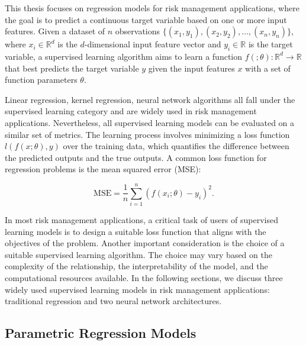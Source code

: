 This thesis focuses on regression models for risk management applications, where the goal is to predict a continuous target variable based on one or more input features.
Given a dataset of $n$ observations $\{(x_1, y_1), (x_2, y_2), \ldots, (x_n, y_n)\}$, where $x_i \in \mathbb{R}^d$ is the $d$-dimensional input feature vector and $y_i \in \mathbb{R}$ is the target variable, a supervised learning algorithm aims to learn a function $f(;\theta): \mathbb{R}^d \rightarrow \mathbb{R}$ that best predicts the target variable $y$ given the input features $x$ with a set of function parameters $\theta$.

Linear regression, kernel regression, neural network algorithms all fall under the supervised learning category and are widely used in risk management applications.
Nevertheless, all supervised learning models can be evaluated on a similar set of metrics.
The learning process involves minimizing a loss function $l(f(x; \theta),y)$ over the training data, which quantifies the difference between the predicted outputs and the true outputs. 
A common loss function for regression problems is the mean squared error (MSE):

\begin{equation}
    \text{MSE} = \frac{1}{n} \sum_{i=1}^{n} (f(x_i;\theta) - y_i)^2.
\end{equation}

In most risk management applications, a critical task of users of supervised learning models is to design a suitable loss function that aligns with the objectives of the problem.
Another important consideration is the choice of a suitable supervised learning algorithm.
The choice may vary based on the complexity of the relationship, the interpretability of the model, and the computational resources available.
In the following sections, we discuss three widely used supervised learning models in risk management applications: traditional regression and two neural network architectures.

\subsection{Parametric Regression Models}

